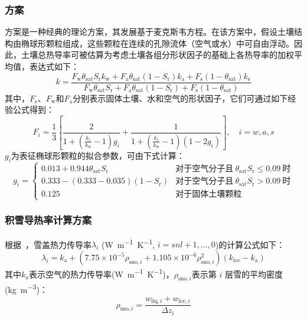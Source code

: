 \subsubsection{\citet{de1963thermal}方案}
\citet{de1963thermal}方案是一种经典的理论方案，其发展基于麦克斯韦方程。在该方案中，假设土壤结构由椭球形颗粒组成，这些颗粒在连续的孔隙流体（空气或水）中可自由浮动。因此，土壤总热导率可被估算为考虑土壤各组分形状因子的基础上各热导率的加权平均值，表达式如下：$$k=\frac{F_{\mathrm {w}} \theta_{\mathrm {sat}}S_{\mathrm {r}}k_{\mathrm {w}} +F_{\mathrm {a}} \theta_{\mathrm {sat}} \left(1-S_{\mathrm {r}} \right)k_{\mathrm {a}} +F_{\mathrm {s}} \left(1-\theta_{\mathrm {sat}} \right)k_{\mathrm {s}} }{F_{\mathrm {w}} \theta_{\mathrm {sat}}S_{\mathrm {r}} +F_{\mathrm {a}} \theta_{\mathrm {sat}} \left(1-S_{\mathrm {r}} \right)+F_{\mathrm {s}} \left(1-\theta_{\mathrm {sat}} \right)}$$
其中，$F_{\mathrm {s}} $、$F_{\mathrm {w}} $和$F_{\mathrm {a}} $分别表示固体土壤、水和空气的形状因子，它们可通过如下经验公式得到：
\begin{equation}
  F_{i} =\frac{1}{3}\left[\frac{2}{1+\left(\frac{k_{i} }{k_{\mathrm {w}} }-1\right)g_{i} }+\frac{1}{1+\left(\frac{k_{i} }{k_{\mathrm {w}} }-1\right)(1-2g_{i} )}\right],\quad i=w,a,s
\end{equation}
$g_{i} $为表征椭球形颗粒的拟合参数，可由下式计算：
\begin{equation}
  g_{i} =\begin{cases}
    0.013+0.944\theta_{\mathrm {sat}}S_{\mathrm {r}}   & \text{对于空气分子且}\ \theta_{\mathrm {sat}}S_{\mathrm {r}} \leqslant 0.09\ \text{时} \\
    0.333-\left(0.333-0.035\right)\left(1-S_{\mathrm {r}} \right) & \text{对于空气分子且}\ \theta_{\mathrm {sat}}S_{\mathrm {r}} >0.09\ \text{时} \\
    0.125 &\text{对于固体土壤颗粒}
  \end{cases}
\end{equation}


\subsubsection{积雪导热率计算方案}
根据~\citet{jordan1991one}，雪盖热力传导率$\lambda_{i} $ (\unit{W.m^{-1}.K^{-1}}, $i=snl+1,\ldots,0$)的计算公式如下：
\begin{equation}
  \lambda_{i}=k_{\mathrm {a}}+\left(7.75 \times 10^{-5} \rho_{\mathrm{sno},i}+1.105 \times 10^{-6} \rho_{\mathrm{sno},i}^{2}\right)\left(k_{\mathrm {ice}}-k_{\mathrm {a}}\right)
\end{equation}
其中$k_{\mathrm {a}} $表示空气的热力传导率(\unit{W.m^{-1}.K^{-1}})，$\rho_{\mathrm{sno},i}$表示第 $i$ 层雪的平均密度(\unit{kg.m^{-3}})：
\begin{equation}
  \rho_{\mathrm{sno},i}=\frac{w_{\mathrm{liq},i}+w_{\mathrm{ice},i}}{\Delta z_{i}}
\end{equation}
